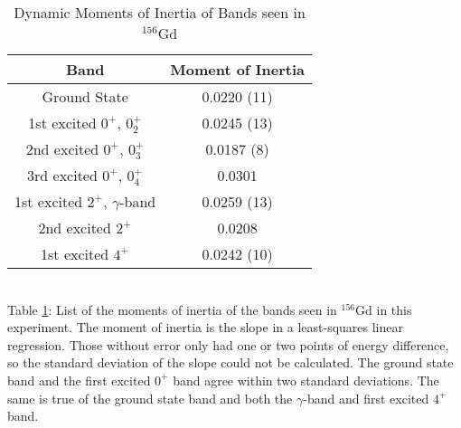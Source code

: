 \begin{table}[!]
    \centering
    \caption{Dynamic Moments of Inertia of Bands seen in $^{156}$Gd}
    \begin{tabular}{c|c}
        \toprule
        Band & Moment of Inertia  \\
        \hline
        Ground State & 0.0220 (11) \\
        1st excited $0^+$, $0^+_2$ & 0.0245 (13) \\
        2nd excited $0^+$, $0^+_3$ & 0.0187 (8) \\
        3rd excited $0^+$, $0^+_4$ & 0.0301 \\
        1st excited $2^+$, $\gamma$-band & 0.0259 (13) \\
        2nd excited $2^+$ & 0.0208 \\
        1st excited $4^+$ & 0.0242 (10)  \\
        \bottomrule
    \end{tabular}
    \\[2pt]
    \footnotesize
    \label{tab:156_Dynamic}
    Table \ref{tab:156_Dynamic}: List of the moments of inertia of the bands seen in $^{156}$Gd in this experiment. The moment of inertia is the slope in a least-squares linear regression. Those without error only had one or two points of energy difference, so the standard deviation of the slope could not be calculated. The ground state band and the first excited $0^+$ band agree within two standard deviations. The same is true of the ground state band and both the $\gamma$-band and first excited $4^+$ band.
\end{table}